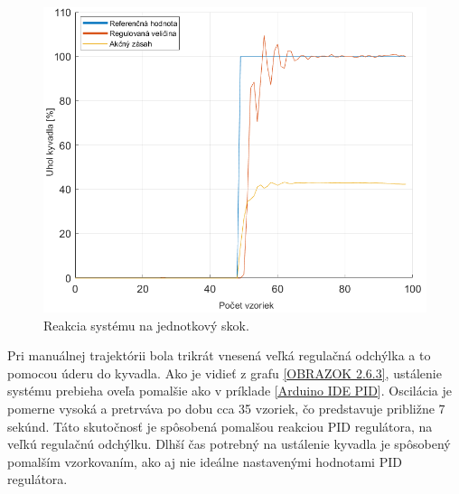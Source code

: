 \begin{figure}[!tbh]
	\centering
	\includegraphics[width=140mm]{obr/jednotkovyskoskMAt.png}
	\caption{Reakcia systému na jednotkový skok.}\label{OBRAZOK 2.6.1}
\end{figure}

Pri manuálnej trajektórii bola trikrát vnesená veľká regulačná odchýlka a to pomocou úderu do kyvadla. Ako je vidieť z grafu \ref{OBRAZOK 2.6.3}, ustálenie systému prebieha oveľa pomalšie ako v príklade \ref{Arduino IDE PID}. Oscilácia je pomerne vysoká a pretrváva po dobu cca 35 vzoriek, čo predstavuje približne 7 sekúnd. Táto skutočnosť je spôsobená pomalšou reakciou PID regulátora, na veľkú regulačnú odchýlku. Dlhší čas potrebný na ustálenie kyvadla je spôsobený pomalším vzorkovaním, ako aj nie ideálne nastavenými hodnotami PID regulátora.  
\vspace{6cm}


